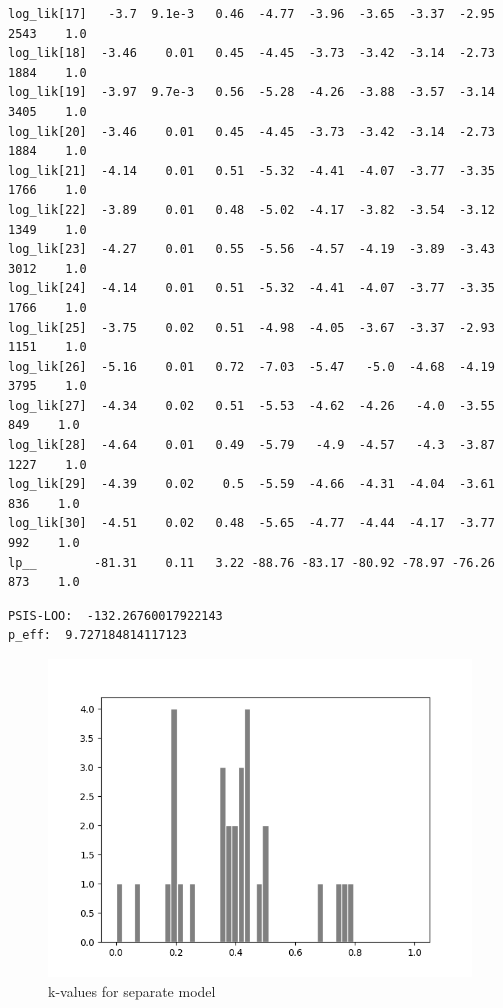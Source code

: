 \documentclass{article}
\begin{document}
\begin{verbatim}
log_lik[17]   -3.7  9.1e-3   0.46  -4.77  -3.96  -3.65  -3.37  -2.95   2543    1.0
log_lik[18]  -3.46    0.01   0.45  -4.45  -3.73  -3.42  -3.14  -2.73   1884    1.0
log_lik[19]  -3.97  9.7e-3   0.56  -5.28  -4.26  -3.88  -3.57  -3.14   3405    1.0
log_lik[20]  -3.46    0.01   0.45  -4.45  -3.73  -3.42  -3.14  -2.73   1884    1.0
log_lik[21]  -4.14    0.01   0.51  -5.32  -4.41  -4.07  -3.77  -3.35   1766    1.0
log_lik[22]  -3.89    0.01   0.48  -5.02  -4.17  -3.82  -3.54  -3.12   1349    1.0
log_lik[23]  -4.27    0.01   0.55  -5.56  -4.57  -4.19  -3.89  -3.43   3012    1.0
log_lik[24]  -4.14    0.01   0.51  -5.32  -4.41  -4.07  -3.77  -3.35   1766    1.0
log_lik[25]  -3.75    0.02   0.51  -4.98  -4.05  -3.67  -3.37  -2.93   1151    1.0
log_lik[26]  -5.16    0.01   0.72  -7.03  -5.47   -5.0  -4.68  -4.19   3795    1.0
log_lik[27]  -4.34    0.02   0.51  -5.53  -4.62  -4.26   -4.0  -3.55    849    1.0
log_lik[28]  -4.64    0.01   0.49  -5.79   -4.9  -4.57   -4.3  -3.87   1227    1.0
log_lik[29]  -4.39    0.02    0.5  -5.59  -4.66  -4.31  -4.04  -3.61    836    1.0
log_lik[30]  -4.51    0.02   0.48  -5.65  -4.77  -4.44  -4.17  -3.77    992    1.0
lp__        -81.31    0.11   3.22 -88.76 -83.17 -80.92 -78.97 -76.26    873    1.0
\end{verbatim}

\begin{verbatim}  
PSIS-LOO:  -132.26760017922143
p_eff:  9.727184814117123
\end{verbatim}
 
 \begin{figure}[H]
\centering  
\includegraphics[scale=0.5]{separate_hist.png}
\caption{k-values for separate model}
\label{fig: label}
\end{figure}
\end{document}
